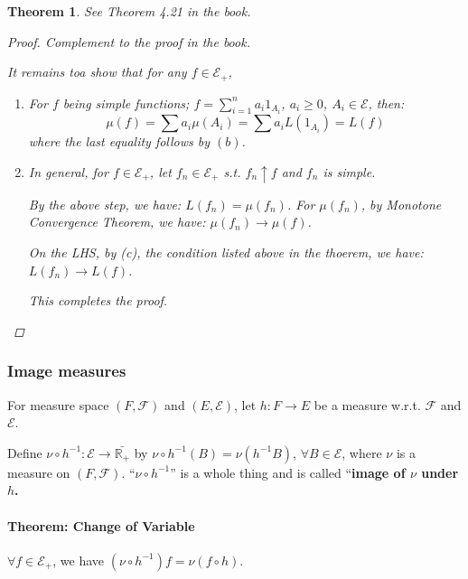 \documentclass[11pt]{article}
\newcommand{\m}{\mathcal}
\newcommand{\R}{{\mathbb R}}
\newtheorem{theorem}{Theorem}[subsection]
\begin{document}
        \begin{theorem}
          See Theorem 4.21 in the book.

          \begin{proof}
            Complement to the proof in the book. 

            It remains toa show that for any $f \in \m E_+$, 

            \begin{enumerate}
              \item For $f$ being simple functions; $f  = \sum_{i=1}^n a_i 1_{A_i}$,
                $a_i \ge 0$, $A_i \in \m E$, then: 
                \[
                  \mu(f) = \sum a_i \mu(A_i) = \sum  a_i L(1_{A_i}) = L(f)
                \]
                where the last equality follows by $(b)$.
              \item In general, for $f \in \m E_+$, let $f_n \in \m E_+$ s.t. $f_n
                \uparrow f$ and $f_n$ is simple. 

                By the above step, we have: $L(f_n) = \mu (f_n)$. For $\mu(f_n)$, by
                Monotone Convergence Theorem, we have: $\mu(f_n) \to \mu (f)$. 

                On the LHS, by (c), the condition listed above in the thoerem, we have:
                $L(f_n) \to L(f)$. 

                This completes the proof.


            \end{enumerate}
          \end{proof}
          \label{thm:uniqueness-of-measure}
        \end{theorem}

        \subsubsection{Image measures}
        For measure space $(F, \m F)$ and $(E, \m E)$, let $h: F \to E$ be a measure
        w.r.t. $\m F$ and $\m E$. 

        Define $\nu \circ h^{-1}: \m E \to \bar {\R_+}$ by $\nu \circ h^{-1}(B) = \nu
        (h^{-1} B)$, $\forall B \in \m E$, where $\nu $ is a measure on $(F, \m F)$. 
        ``$\nu \circ h^{-1}$'' is a whole thing and is called ``\textbf{image of $\nu$
        under $h$.}

        \paragraph{Theorem: Change of Variable}
        $\forall f \in \m E_+$, we have $(\nu \circ h^{-1}) f  = \nu (f\circ h)$. 
\end{document}
